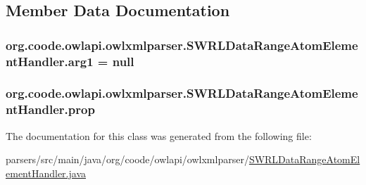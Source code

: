 \subsection{Member Data Documentation}
\hypertarget{classorg_1_1coode_1_1owlapi_1_1owlxmlparser_1_1_s_w_r_l_data_range_atom_element_handler_ac21abdf602431602bd6734c35e09c5ab}{
\subsubsection[{arg1}]{ org.\-coode.\-owlapi.\-owlxmlparser.\-S\-W\-R\-L\-Data\-Range\-Atom\-Element\-Handler.\-arg1 = null\hspace{0.3cm}{\ttfamily [private]}}}\label{classorg_1_1coode_1_1owlapi_1_1owlxmlparser_1_1_s_w_r_l_data_range_atom_element_handler_ac21abdf602431602bd6734c35e09c5ab}
\hypertarget{classorg_1_1coode_1_1owlapi_1_1owlxmlparser_1_1_s_w_r_l_data_range_atom_element_handler_a1ecded6cb1cacdbaecf453a46b8c0b40}{
\subsubsection[{prop}]{ org.\-coode.\-owlapi.\-owlxmlparser.\-S\-W\-R\-L\-Data\-Range\-Atom\-Element\-Handler.\-prop\hspace{0.3cm}{\ttfamily [private]}}}\label{classorg_1_1coode_1_1owlapi_1_1owlxmlparser_1_1_s_w_r_l_data_range_atom_element_handler_a1ecded6cb1cacdbaecf453a46b8c0b40}


The documentation for this class was generated from the following file\-:\begin{DoxyCompactItemize}
\item 
parsers/src/main/java/org/coode/owlapi/owlxmlparser/\hyperlink{_s_w_r_l_data_range_atom_element_handler_8java}{S\-W\-R\-L\-Data\-Range\-Atom\-Element\-Handler.\-java}\end{DoxyCompactItemize}

